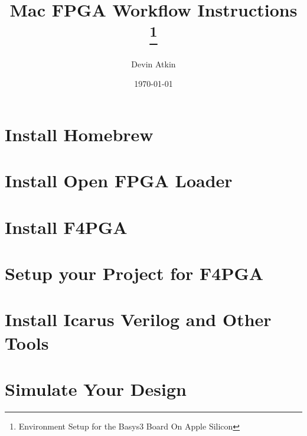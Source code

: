 \documentclass{report}
\title{Mac FPGA Workflow Instructions \thanks{Environment Setup for the Basys3 Board On Apple Silicon}}
\author{Devin Atkin}
\date{\today}
\begin{document}
\maketitle



\section{Install Homebrew}


\section{Install Open FPGA Loader}


\section{Install F4PGA}


\section{Setup your Project for F4PGA}


\section{Install Icarus Verilog and Other Tools}


\section{Simulate Your Design}

\end{document}
